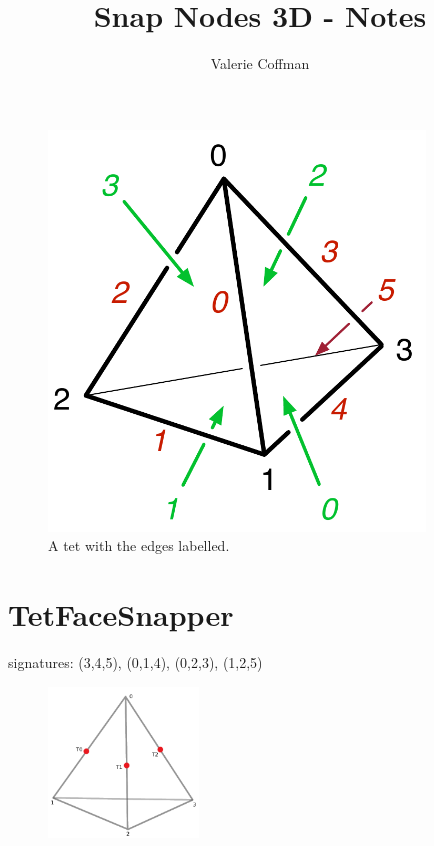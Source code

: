 \documentclass{article}
\begin{document}
\title{Snap Nodes 3D - Notes}
\author{Valerie Coffman}
\maketitle

\begin{figure}[h!]
\includegraphics[width=10cm]{tet}
\caption{A tet with the edges labelled.}
\end{figure}
\clearpage

\section{TetFaceSnapper}

signatures: (3,4,5), (0,1,4), (0,2,3), (1,2,5)

\begin{figure}[h!]
\includegraphics[width=4cm]{TetFaceSnapper}
\end{figure}
\end{document}
